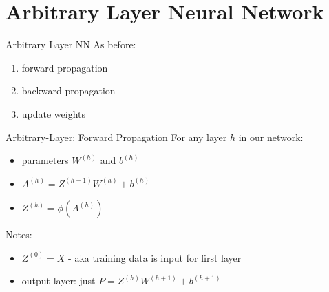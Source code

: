 \documentclass{beamer}
\begin{document}
  \section{Arbitrary Layer Neural Network}
  \begin{frame}{Arbitrary Layer NN}
    As before:
    \begin{enumerate}
      \item forward propagation

      \item backward propagation

      \item update weights
    \end{enumerate}

  \end{frame}

  \begin{frame}{Arbitrary-Layer: Forward Propagation}
    For any layer $h$ in our network:
    \begin{itemize}
      \item parameters $W^{(h)}$ and $b^{(h)}$
      \item $A^{(h)} = Z^{(h-1)} W^{(h)} + b^{(h)}$
      \item $Z^{(h)} = \phi\left( A^{(h)} \right)$
    \end{itemize}

    Notes:
    \begin{itemize}
      \item $Z^{(0)} = X$ - aka training data is input for first layer
      \item output layer: just $P = Z^{(h)} W^{(h+1)} + b^{(h+1)}$
    \end{itemize}
  \end{frame}
\end{document}
